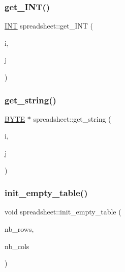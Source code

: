 \subsubsection{\texorpdfstring{get\+\_\+\+I\+N\+T()}{get\_INT()}}
{\footnotesize\ttfamily \mbox{\hyperlink{galois_8h_a09fddde158a3a20bd2dcadb609de11dc}{I\+NT}} spreadsheet\+::get\+\_\+\+I\+NT (\begin{DoxyParamCaption}\item[{\mbox{\hyperlink{galois_8h_a09fddde158a3a20bd2dcadb609de11dc}{I\+NT}}}]{i,  }\item[{\mbox{\hyperlink{galois_8h_a09fddde158a3a20bd2dcadb609de11dc}{I\+NT}}}]{j }\end{DoxyParamCaption})}

\mbox{\label{classspreadsheet_a4b8b158f6dd85e6cdb3cdc919954d6be}} 
\subsubsection{\texorpdfstring{get\+\_\+string()}{get\_string()}}
{\footnotesize\ttfamily \mbox{\hyperlink{galois_8h_ab6cc7b4aeb6ea31aba2b3fbfc83ff5e6}{B\+Y\+TE}} $\ast$ spreadsheet\+::get\+\_\+string (\begin{DoxyParamCaption}\item[{\mbox{\hyperlink{galois_8h_a09fddde158a3a20bd2dcadb609de11dc}{I\+NT}}}]{i,  }\item[{\mbox{\hyperlink{galois_8h_a09fddde158a3a20bd2dcadb609de11dc}{I\+NT}}}]{j }\end{DoxyParamCaption})}

\mbox{\label{classspreadsheet_ad941232fa1d9ccf29fcebb8e56c15681}} 
\subsubsection{\texorpdfstring{init\+\_\+empty\+\_\+table()}{init\_empty\_table()}}
{\footnotesize\ttfamily void spreadsheet\+::init\+\_\+empty\+\_\+table (\begin{DoxyParamCaption}\item[{\mbox{\hyperlink{galois_8h_a09fddde158a3a20bd2dcadb609de11dc}{I\+NT}}}]{nb\+\_\+rows,  }\item[{\mbox{\hyperlink{galois_8h_a09fddde158a3a20bd2dcadb609de11dc}{I\+NT}}}]{nb\+\_\+cols }\end{DoxyParamCaption})}

